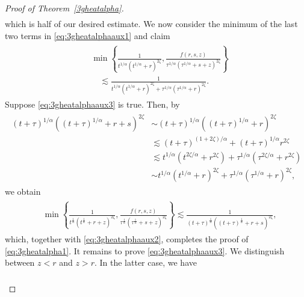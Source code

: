 \documentclass[12pt,reqno,a4paper]{amsart}
\theoremstyle{definition}
\theoremstyle{remark}
\numberwithin{equation}{section}
\newcommand{\1}{\mathbbm{1}}
\begin{document}
\begin{proof}[Proof of Theorem~\ref{3gheatalpha}]
\begin{align}
  \end{align}
  which is half of our desired estimate. We now consider the minimum of the last two terms in \eqref{eq:3gheatalphaaux1} and claim
  \begin{align}
    \label{eq:3gheatalphaaux3}
    \begin{split}
      & \min\left\{\frac{1}{t^{1/\alpha}(t^{1/\alpha}+r)^{2\zeta}},\frac{f(r,s,z)}{\tau^{1/\alpha}(\tau^{1/\alpha}+s+z)^{2\zeta}}\right\} \\
      & \quad \lesssim \frac{1}{t^{1/\alpha}(t^{1/\alpha}+r)^{2\zeta} + \tau^{1/\alpha}(\tau^{1/\alpha}+r)^{2\zeta}}.
    \end{split}
  \end{align}
  Suppose \eqref{eq:3gheatalphaaux3} is true. Then, by
  \begin{align}
    \begin{split}
      (t+\tau)^{1/\alpha}((t+\tau)^{1/\alpha}+r+s)^{2\zeta}
      & \sim (t+\tau)^{1/\alpha}((t+\tau)^{1/\alpha}+r)^{2\zeta} \\
      & \lesssim (t+\tau)^{(1+2\zeta)/\alpha} + (t+\tau)^{1/\alpha}r^{2\zeta} \\
      & \lesssim t^{1/\alpha}(t^{2\zeta/\alpha}+r^{2\zeta}) + \tau^{1/\alpha}(\tau^{2\zeta/\alpha}+r^{2\zeta}) \\
      & \sim t^{1/\alpha}(t^{1/\alpha}+r)^{2\zeta} + \tau^{1/\alpha}(\tau^{1/\alpha}+r)^{2\zeta},
    \end{split}
  \end{align}
  we obtain
  \begin{align}
    \label{eq:3gheatalphaaux4}
    \begin{split}
      & \min\left\{\frac{1}{t^{\frac1\alpha}(t^{\frac1\alpha}+r+z)^{2\zeta}},\frac{f(r,s,z)}{\tau^{\frac1\alpha}(\tau^{\frac1\alpha}+s+z)^{2\zeta}}\right\}
      \lesssim \frac{1}{(t+\tau)^{\frac1\alpha}((t+\tau)^{\frac1\alpha}+r+s)^{2\zeta}},
    \end{split}
  \end{align}
  which, together with \eqref{eq:3gheatalphaaux2}, completes the proof of \eqref{eq:3gheatalpha1}. It remains to prove \eqref{eq:3gheatalphaaux3}. We distinguish between $z<r$ and $z>r$. In the latter case, we have
  \begin{align}
    \label{eq:3gheatalphaaux5}
    \begin{split}

\end{split}
\end{align}
\end{proof}
\end{document}

